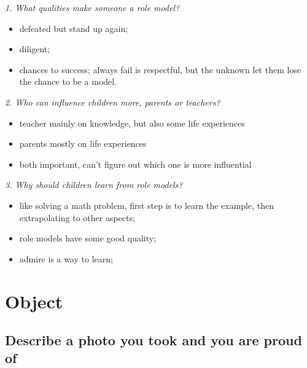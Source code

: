\documentclass[conference]{IEEEtran}
\begin{document}
\textit{1. What qualities make someone a role model?}

\begin{itemize}
    \item defeated but stand up again; 
    \item diligent; 
    \item chances to success; always fail is respectful, but the unknown let them lose the chance to be a model.
\end{itemize}

\textit{2. Who can influence children more, parents or teachers?}
\begin{itemize}
    \item teacher mainly on knowledge, but also some life experiences
    \item parents mostly on life experiences
    \item both important, can't figure out which one is more influential
\end{itemize}

\textit{3. Why should children learn from role models?}

\begin{itemize}
    \item like solving a math problem, first step is to learn the example, then extrapolating to other aspects;
    \item role models have some good quality;
    \item admire is a way to learn;
\end{itemize}


\section{Object}
\subsection{Describe a photo you took and you are proud of}
\end{document}
